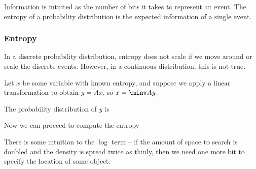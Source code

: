 \documentclass[12pt]{article}
\begin{document}
Information is intuited as the number of bits it takes to represent an event. The entropy of a probability distribution is the expected information of a single event. 

\subsubsection{Entropy}


In a discrete probability distribution, entropy does not scale if we move around or scale the discrete events. However, in a continuous distribution, this is not true.

Let $x$ be some variable with known entropy, and suppose we apply a linear transformation to obtain $y = Ax$, so $x = \minv A y$.

The probability distribution of $y$ is

Now we can proceed to compute the entropy

There is some intuition to the $\log$ term -- if the amount of space to search is doubled and the density is spread twice as thinly, then we need one more bit to specify the location of some object.
\end{document}
